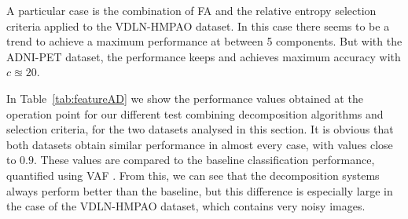 A particular case is the combination of \ac{FA} and the relative entropy selection criteria applied to the VDLN-HMPAO dataset. In this case there seems to be a trend to achieve a maximum performance at between 5 components. But with the ADNI-PET dataset, the performance keeps and achieves maximum accuracy with $c\approxeq 20$. 

In Table~\ref{tab:featureAD} we show the performance values obtained at the operation point for our different test combining decomposition algorithms and selection criteria, for the two datasets analysed in this section. It is obvious that both datasets obtain similar performance in almost every case, with values close to $0.9$. These values are compared to the baseline classification performance, quantified using \ac{VAF} \cite{Stoeckel04}. From this, we can see that the decomposition systems always perform better than the baseline, but this difference is especially large in the case of the VDLN-HMPAO dataset, which contains very noisy images. 

